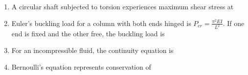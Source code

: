 \documentclass[journal,12pt,onecolumn]{IEEEtran}
\theoremstyle{remark}
\begin{document}
\begin{enumerate}
\item A circular shaft subjected to torsion experiences maximum shear stress at\hfill{}

\begin{enumerate}[label=\Alph*.]
\end{enumerate}

\item Euler’s buckling load for a column with both ends hinged is $P_{cr} = \frac{\pi^2 EI}{L^2}$.  
If one end is fixed and the other free, the buckling load is\hfill{}

\begin{enumerate}[label=\Alph*.]
\end{enumerate}

\item For an incompressible fluid, the continuity equation is\hfill{}

\begin{enumerate}[label=\Alph*.]
\end{enumerate}

\item Bernoulli’s equation represents conservation of\hfill{}


\end{enumerate}
\end{document}
